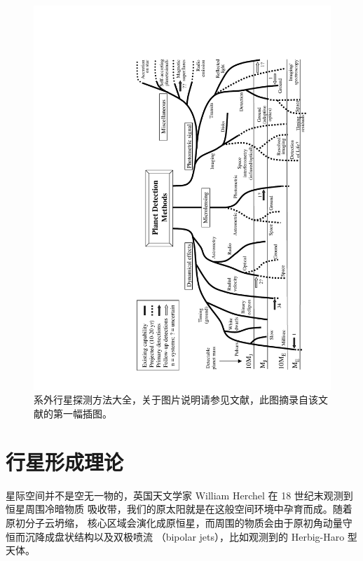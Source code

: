 \begin{figure}
    \centering
    \includegraphics[scale=0.95, angle=-90]{figures/chapter1/fig4_fmethods.pdf}
    \caption[系外行星探测方法大全，图片版权 Michael Perryman。]{系外行星探测方法大全，关于图片说明请参见文献，此图摘录自该文献的第一幅插图。}
    \label{fig:detmethod}
\end{figure}


\section{行星形成理论} \label{sec:pltfrmatntheory}

星际空间并不是空无一物的，英国天文学家 William Herchel 在 18 世纪末观测到恒星周围冷暗物质
吸收带，我们的原太阳就是在这般空间环境中孕育而成\cite{Spitzer1978}。随着原初分子云坍缩，
核心区域会演化成原恒星，而周围的物质会由于原初角动量守恒而沉降成盘状结构以及双极喷流
（bipolar jets），比如观测到的 Herbig-Haro 型天体\cite{Lequeux2005}。

